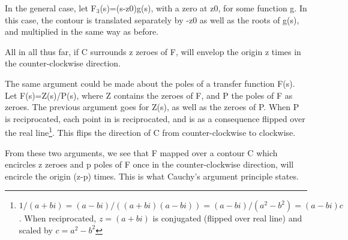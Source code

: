 In the general case, let F$_3$(s)=(s-z0)g(s), with a zero at z0, for some function g. In this case, the contour is translated separately by -z0 as well as the roots of g(s), and multiplied in the same way as before.

All in all thus far, if C surrounds z zeroes of F,  will envelop the origin z times in the counter-clockwise direction.

The same argument could be made about the poles of a transfer function F(s). Let F(s)=Z(s)/P(s), where Z contains the zeroes of F, and P the poles of F as zeroes. The previous argument goes for Z(s), as well as the zeroes of P. When P is reciprocated, each point in  is reciprocated, and is as a consequence flipped over the real line\footnote{$1/(a+bi)=(a-bi)/((a+bi)(a-bi))=(a-bi)/(a^2-b^2)=(a-bi)c$. When reciprocated, $z=(a+bi)$ is conjugated (flipped over real line) and scaled by $c=a^2-b^2$}. This flips the direction of C from counter-clockwise to clockwise. 

From these two arguments, we see that F mapped over a contour C which encircles z zeroes and p poles of F once in the counter-clockwise direction, will encircle the origin (z-p) times. This is what Cauchy's argument principle states.




